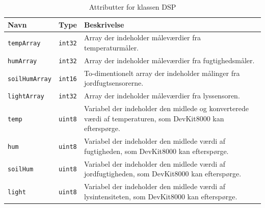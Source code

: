 \begin{table}[h]
\begin{tabularx}{\textwidth}{| >{\raggedright\arraybackslash}X | >{\raggedright\arraybackslash}X | >{\raggedright\arraybackslash}p{8 cm} |} \hline
Navn & Type & Beskrivelse \\\hline
\texttt{tempArray} & \texttt{int32} & Array der indeholder måleværdier fra temperaturmåler. \\\hline
\texttt{humArray} & \texttt{int32} & Array der indeholder måleværdier fra fugtighedsmåler. \\\hline
\texttt{soilHumArray} & \texttt{int16} & To-dimentionelt array der indeholder målinger fra jordfugtsensorerne. \\\hline
\texttt{lightArray} & \texttt{int32} & Array der indeholder måleværdier fra lyssensoren. \\\hline
\texttt{temp} & \texttt{uint8} & Variabel der indeholder den midlede og konverterede værdi af temperaturen, som DevKit8000 kan efterspørge. \\\hline
\texttt{hum} & \texttt{uint8} & Variabel der indeholder den midlede værdi af fugtigheden, som DevKit8000 kan efterspørge. \\\hline
\texttt{soilHum} & \texttt{uint8} & Variabel der indeholder den midlede værdi af jordfugtigheden, som DevKit8000 kan efterspørge. \\\hline
\texttt{light} & \texttt{uint8} & Variabel der indeholder den midlede værdi af lysintensiteten, som DevKit8000 kan efterspørge. \\\hline
\end{tabularx}
\caption{Attributter for klassen DSP}
\label{table:DSP_attributter}
\end{table}

